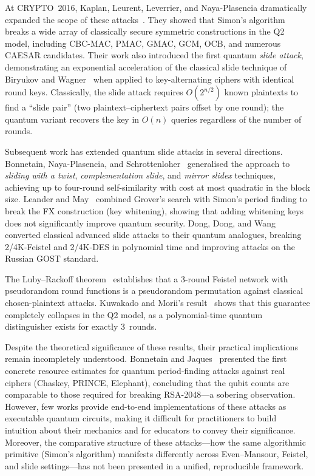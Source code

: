 \documentclass[11pt,a4paper]{article}
\begin{document}
At CRYPTO~2016, Kaplan, Leurent, Leverrier, and Naya-Plasencia
dramatically expanded the scope of these
attacks~\cite{Kaplan2016}.  They showed that Simon's algorithm breaks a
wide array of classically secure symmetric constructions in the Q2 model,
including CBC-MAC, PMAC, GMAC, GCM, OCB, and numerous CAESAR
candidates.  Their work also introduced the first quantum \emph{slide
attack}, demonstrating an exponential acceleration of the classical slide
technique of Biryukov and Wagner~\cite{Biryukov1999} when applied to
key-alternating ciphers with identical round keys.  Classically, the
slide attack requires $O(2^{n/2})$ known plaintexts to find a ``slide
pair'' (two plaintext--ciphertext pairs offset by one round); the quantum
variant recovers the key in $O(n)$ queries regardless of the number of
rounds.

Subsequent work has extended quantum slide attacks in several directions.
Bonnetain, Naya-Plasencia, and Schrottenloher~\cite{Bonnetain2019}
generalised the approach to \emph{sliding with a twist},
\emph{complementation slide}, and \emph{mirror slidex} techniques,
achieving up to four-round self-similarity with cost at most quadratic in
the block size.  Leander and May~\cite{Leander2017} combined Grover's
search with Simon's period finding to break the FX construction (key
whitening), showing that adding whitening keys does not significantly
improve quantum security.  Dong, Dong, and Wang~\cite{Dong2020}
converted classical advanced slide attacks to their quantum analogues,
breaking 2/4K-Feistel and 2/4K-DES in polynomial time and improving
attacks on the Russian GOST standard.

The Luby--Rackoff theorem~\cite{LubyRackoff1988} establishes that a
3-round Feistel network with pseudorandom round functions is a
pseudorandom permutation against classical chosen-plaintext attacks.
Kuwakado and Morii's result~\cite{Kuwakado2010} shows that this guarantee
completely collapses in the Q2 model, as a polynomial-time quantum
distinguisher exists for exactly 3~rounds.

Despite the theoretical significance of these results, their practical
implications remain incompletely understood.  Bonnetain and
Jaques~\cite{Bonnetain2020} presented the first concrete resource
estimates for quantum period-finding attacks against real ciphers
(Chaskey, PRINCE, Elephant), concluding that the qubit counts are
comparable to those required for breaking RSA-2048---a sobering
observation.  However, few works provide end-to-end implementations of
these attacks as executable quantum circuits, making it difficult for
practitioners to build intuition about their mechanics and for educators
to convey their significance.  Moreover, the comparative structure of
these attacks---how the same algorithmic primitive (Simon's algorithm)
manifests differently across Even--Mansour, Feistel, and slide
settings---has not been presented in a unified, reproducible framework.
\end{document}
